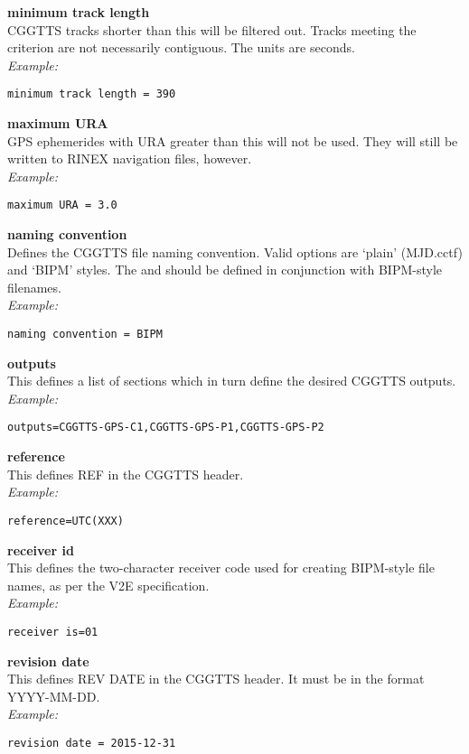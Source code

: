 {\bfseries minimum track length}\\
CGGTTS tracks shorter than this will be filtered out. Tracks meeting the criterion are not necessarily contiguous.
The units are seconds.\\
\textit{Example:}
\begin{lstlisting}
minimum track length = 390
\end{lstlisting}

{\bfseries maximum URA}\\
GPS ephemerides with URA greater than this will not be used. 
They will still be written to RINEX navigation files, however.\\
\textit{Example:}
\begin{lstlisting}
maximum URA = 3.0
\end{lstlisting}

{\bfseries naming convention}\\
Defines the CGGTTS file naming convention. Valid options are `plain' (MJD.cctf) and `BIPM' styles.
The  and  should be defined in conjunction with BIPM-style filenames.\\
\textit{Example:}
\begin{lstlisting}
naming convention = BIPM
\end{lstlisting}

{\bfseries outputs}\\
This defines a list of sections which in turn define the desired CGGTTS outputs.\\
\textit{Example:}
\begin{lstlisting}
outputs=CGGTTS-GPS-C1,CGGTTS-GPS-P1,CGGTTS-GPS-P2
\end{lstlisting}

{\bfseries reference}\\
This defines REF in the CGGTTS header.\\
\textit{Example:}
\begin{lstlisting}
reference=UTC(XXX)
\end{lstlisting}

{\bfseries receiver id}\\
This defines the two-character receiver code used for creating BIPM-style file names, 
as per the V2E specification.\\
\textit{Example:}
\begin{lstlisting}
receiver is=01
\end{lstlisting}

{\bfseries revision date}\\
This defines REV DATE in the CGGTTS header. It must be in the format YYYY-MM-DD.\\
\textit{Example:}
\begin{lstlisting}
revision date = 2015-12-31
\end{lstlisting}

